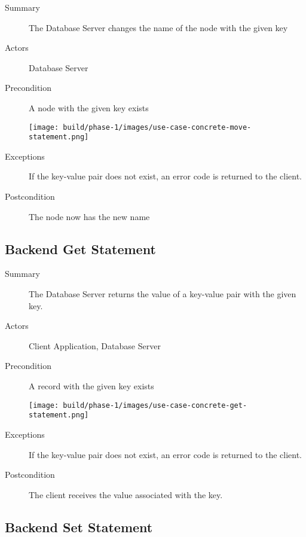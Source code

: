 \documentclass[a4paper]{report}
\begin{document}
	\begin{description}
		\item[Summary] The Database Server changes the name of the node with the given key
		\item[Actors] Database Server
		\item[Precondition] A node with the given key exists

		\begin{center}
			\texttt{[image: build/phase-1/images/use-case-concrete-move-statement.png]}
		\end{center}

		\item[Exceptions] If the key-value pair does not exist, an error code is returned to the client.
		\item[Postcondition] The node now has the new name
	\end{description}

	\pagebreak
	
	\subsection{Backend Get Statement}

	\begin{description}
		\item[Summary] The Database Server returns the value of a key-value pair with the given key.
		\item[Actors] Client Application, Database Server
		\item[Precondition] A record with the given key exists

		\begin{center}
			\texttt{[image: build/phase-1/images/use-case-concrete-get-statement.png]}
		\end{center}

		\item[Exceptions] If the key-value pair does not exist, an error code is returned to the client.
		\item[Postcondition] The client receives the value associated with the key.
	\end{description}

	\pagebreak
	
	\subsection{Backend Set Statement}
\end{document}
